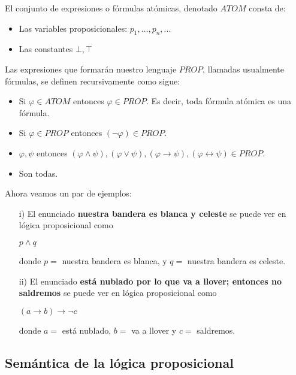 \documentclass[letterpaper,11pt]{article}
\begin{document}
    El conjunto de expresiones o fórmulas atómicas, denotado $ATOM$ consta de:

    \begin{itemize}
        \item Las variables proposicionales: $p_{1}, ..., p_{n}, ...$
        \item Las constantes $\bot, \top$
    \end{itemize}
    
    Las expresiones que formarán nuestro lenguaje $PROP$, llamadas usualmente
    fórmulas, se definen recursivamente como sigue: 
    
    \begin{itemize}
        \item Si $\varphi \in ATOM$ entonces $\varphi \in PROP$. Es decir,
        toda fórmula atómica es una fórmula.
        \item Si $\varphi \in PROP$ entonces $(\neg \varphi) \in PROP$.
        \item $\varphi, \psi$ entonces $(\varphi \land \psi), 
        (\varphi \lor \psi), (\varphi \rightarrow \psi), 
        (\varphi \leftrightarrow \psi) \in PROP$.
        \item Son todas.
    \end{itemize}
    
    Ahora veamos un par de ejemplos:
    \begin{itemize}
        \item[i)] El enunciado \textbf{nuestra bandera es blanca y celeste} se
        puede ver en lógica proposicional como 
        \begin{center}
            $p \land q$
        \end{center}
        donde $p =$ nuestra bandera es blanca, y $q =$ nuestra bandera es
        celeste.
        \item[ii)] El enunciado \textbf{está nublado por lo que va a llover;
        entonces no saldremos} se puede ver en lógica proposicional como 
        \begin{center}
            $(a \rightarrow b) \rightarrow \neg c$
        \end{center}
        donde $a =$ está nublado, $b =$ va a llover y $c =$ saldremos.
    \end{itemize}

    \subsection{Semántica de la lógica proposicional}
    \newtheorem{teo}{Definición}[]
\end{document}

